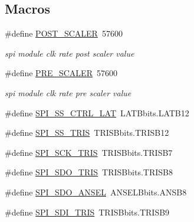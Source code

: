 \subsection*{Macros}
\begin{DoxyCompactItemize}
\item 
\#define \hyperlink{a00013_a5df9b14c775d6e4eab17c79a729a4dbf}{P\+O\+S\+T\+\_\+\+S\+C\+A\+L\+E\+R}~57600
\begin{DoxyCompactList}\small\item\em spi module clk rate post scaler value \end{DoxyCompactList}\item 
\#define \hyperlink{a00013_a5c1fd7fa207a92f0b4b78d39bbd2f34b}{P\+R\+E\+\_\+\+S\+C\+A\+L\+E\+R}~57600
\begin{DoxyCompactList}\small\item\em spi module clk rate pre scaler value \end{DoxyCompactList}\item 
\#define \hyperlink{a00013_aa8b53e04161d178ebd9c01edf1584039}{S\+P\+I\+\_\+\+S\+S\+\_\+\+C\+T\+R\+L\+\_\+\+L\+A\+T}~L\+A\+T\+Bbits.\+L\+A\+T\+B12
\item 
\#define \hyperlink{a00013_a1424f86a2482cfbcf68f709ce542e262}{S\+P\+I\+\_\+\+S\+S\+\_\+\+T\+R\+I\+S}~T\+R\+I\+S\+Bbits.\+T\+R\+I\+S\+B12
\item 
\#define \hyperlink{a00013_a98c4bd0ee0f76eb205e874355bf9cd33}{S\+P\+I\+\_\+\+S\+C\+K\+\_\+\+T\+R\+I\+S}~T\+R\+I\+S\+Bbits.\+T\+R\+I\+S\+B7
\item 
\#define \hyperlink{a00013_aa171067a2f57d1555ab4449c78847c72}{S\+P\+I\+\_\+\+S\+D\+O\+\_\+\+T\+R\+I\+S}~T\+R\+I\+S\+Bbits.\+T\+R\+I\+S\+B8
\item 
\#define \hyperlink{a00013_a11571727bdbc21b0bfb7c701599e759b}{S\+P\+I\+\_\+\+S\+D\+O\+\_\+\+A\+N\+S\+E\+L}~A\+N\+S\+E\+L\+Bbits.\+A\+N\+S\+B8
\item 
\#define \hyperlink{a00013_a40c85fd42ffb12b326b7cb9ee48f2ffb}{S\+P\+I\+\_\+\+S\+D\+I\+\_\+\+T\+R\+I\+S}~T\+R\+I\+S\+Bbits.\+T\+R\+I\+S\+B9
\end{DoxyCompactItemize}
